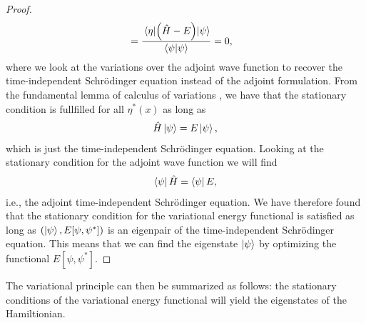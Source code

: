 \begin{proof}
\begin{align}
                &=
                \frac{
                    \mel{\eta}{\left( \hat{H}- E \right)}{\psi}
                }{
                    \braket{\psi}
                }
                = 0,
            \end{align}
            where we look at the variations over the adjoint wave function to
            recover the time-independent Schrödinger equation instead of the
            adjoint formulation.
            From the fundamental lemma of calculus of variations
            \cite{wiki:fundamental-lemma}, we have that the stationary condition
            is fullfilled for all $\eta^{*}(x)$ as long as
            \begin{align}
                \hat{H}\ket{\psi}
                = E\ket{\psi},
            \end{align}
            which is just the time-independent Schrödinger equation.
            Looking at the stationary condition for the adjoint wave function we
            will find
            \begin{align}
                \bra{\psi}\hat{H} = \bra{\psi}E,
            \end{align}
            i.e., the adjoint time-independent Schrödinger equation.
            We have therefore found that the stationary condition for the
            variational energy functional is satisfied as long as $(\ket{\psi},
            E[\psi, \psi^{*}])$ is an eigenpair of the time-independent
            Schrödinger equation.
            This means that we can find the eigenstate $\ket{\psi}$ by
            optimizing the functional $E[\psi, \psi^{*}]$.
        \end{proof}
        The variational principle can then be summarized as follows: the
        stationary conditions of the variational energy functional will yield
        the eigenstates of the Hamiltionian.

